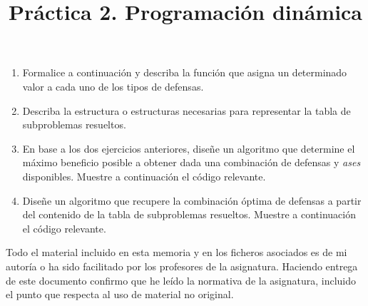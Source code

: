 \documentclass[]{article}
\title{Práctica 2. Programación dinámica}
\author{}
\begin{document}
\maketitle


%

\begin{enumerate}
\item Formalice a continuación y describa la función que asigna un determinado valor a cada uno de los tipos de defensas.



\item Describa la estructura o estructuras necesarias para representar la tabla de subproblemas resueltos.



\item En base a los dos ejercicios anteriores, diseñe un algoritmo que determine el máximo beneficio posible a obtener dada una combinación de defensas y \emph{ases} disponibles. Muestre a continuación el código relevante.



\item Diseñe un algoritmo que recupere la combinación óptima de defensas a partir del contenido de la tabla de subproblemas resueltos. Muestre a continuación el código relevante.



\end{enumerate}

Todo el material incluido en esta memoria y en los ficheros asociados es de mi autoría o ha sido facilitado por los profesores de la asignatura. Haciendo entrega de este documento confirmo que he leído la normativa de la asignatura, incluido el punto que respecta al uso de material no original.
\end{document}
